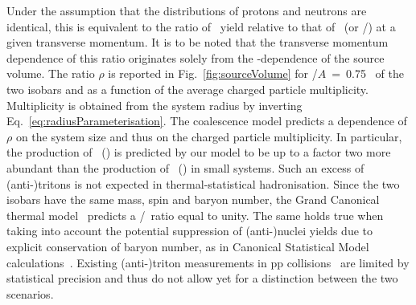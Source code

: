\documentclass[%
 reprint,
 amsmath,amssymb,
 aps,
]{revtex4-1}
\begin{document}
\noindent Under the assumption that the distributions of protons and neutrons are identical, this is equivalent to the ratio of \tritium~yield relative to that of \hethree~(or \antitritium/\antihethree) at a given transverse momentum. It is to be noted that the transverse momentum dependence of this ratio originates solely from the \pt-dependence of the source volume. 
The ratio $\rho$ is reported in Fig.~\ref{fig:sourceVolume} for \pt/$A$~=~0.75 \GeVc~of the two isobars and as a function of the average charged particle multiplicity. Multiplicity is obtained from the system radius by inverting Eq.~\ref{eq:radiusParameterisation}.
The coalescence model predicts a dependence of $\rho$ on the system size and thus on the charged particle multiplicity. In particular, the production of \tritium~(\antitritium) is predicted by our model to be up to a factor two more abundant than the production of \hethree~(\antihethree) in small systems. Such an excess of (anti-)tritons is not expected in thermal-statistical hadronisation. Since the two isobars have the same mass, spin and baryon number, the Grand Canonical thermal model~\cite{Andronic:2010qu,Andronic:2017} predicts a \tritium/\hethree~ratio equal to unity. The same holds true when taking into account the potential suppression of \mbox{(anti-)nuclei} yields due to explicit conservation of baryon number, as in Canonical Statistical Model calculations~\cite{Vovchenko:2018fiy}.
Existing (anti-)triton measurements in pp collisions~\cite{ALICE:nucleipp2017} are limited by statistical precision and thus do not allow yet for a distinction between the two scenarios.
\end{document}
